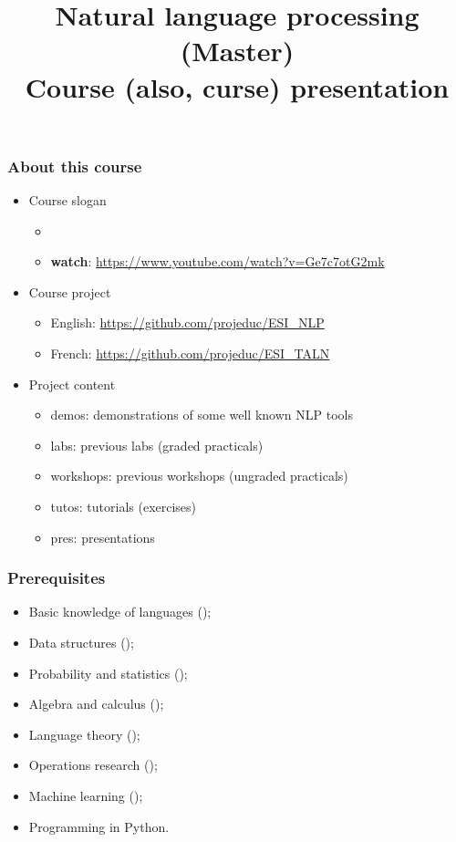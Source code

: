 \documentclass{beamer}
\title[ESI - NLP(master): Presentation] %
{Natural language processing (Master)\\Course (also, curse) presentation}
\begin{document}
 
 
 \begin{frame}
 	\frametitle{About this course}
 	
 	\begin{itemize}
 		\item Course slogan
 		\begin{itemize}
 			\item {}
 			\item \textbf{watch}: \url{https://www.youtube.com/watch?v=Ge7c7otG2mk}
 		\end{itemize}
 		\item Course project
 		\begin{itemize}
 			\item English: \url{https://github.com/projeduc/ESI_NLP}
 			\item French: \url{https://github.com/projeduc/ESI_TALN}
 		\end{itemize}
 		\item Project content
 		\begin{itemize}
 			\item demos: demonstrations of some well known NLP tools 
 			\item labs: previous labs (graded practicals)
 			\item workshops: previous workshops (ungraded practicals)
 			\item tutos: tutorials (exercises) 
 			\item pres: presentations
 		\end{itemize}
 	\end{itemize}
 	
 \end{frame}

\begin{frame}
\frametitle{Prerequisites}

\begin{itemize}
	\item Basic knowledge of languages ();
	\item Data structures ();
	\item Probability and statistics ();
	\item Algebra and calculus ();
	\item Language theory ();
	\item Operations research ();
	\item Machine learning ();
	\item Programming in Python.
\end{itemize}

\end{frame}
\end{document}
